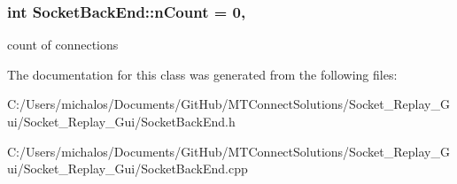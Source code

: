 \subsubsection[{n\+Count}]{\setlength{\rightskip}{0pt plus 5cm}int Socket\+Back\+End\+::n\+Count = 0\hspace{0.3cm}{\ttfamily [static]}, {\ttfamily [protected]}}\label{class_socket_back_end_a4c78e1cdf4cf31d732861f26744618c7}
count of connections 

The documentation for this class was generated from the following files\+:\begin{DoxyCompactItemize}
\item 
C\+:/\+Users/michalos/\+Documents/\+Git\+Hub/\+M\+T\+Connect\+Solutions/\+Socket\+\_\+\+Replay\+\_\+\+Gui/\+Socket\+\_\+\+Replay\+\_\+\+Gui/Socket\+Back\+End.\+h\item 
C\+:/\+Users/michalos/\+Documents/\+Git\+Hub/\+M\+T\+Connect\+Solutions/\+Socket\+\_\+\+Replay\+\_\+\+Gui/\+Socket\+\_\+\+Replay\+\_\+\+Gui/Socket\+Back\+End.\+cpp\end{DoxyCompactItemize}
